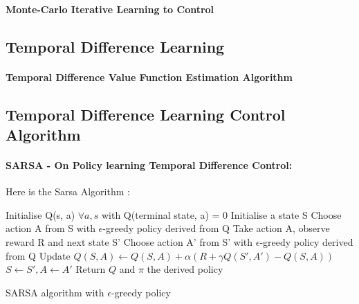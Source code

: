 		\paragraph*{Monte-Carlo Iterative Learning to Control}

	\subsection{Temporal Difference Learning} %
		\label{sub:temporal_difference_learning}
		
		\paragraph*{Temporal Difference Value Function Estimation Algorithm}

	\subsection{Temporal Difference Learning Control Algorithm} %
		\label{sub:temporal_difference_learning_control_algorithm}
		
		\paragraph*{SARSA - On Policy learning Temporal Difference Control:}
			Here is the Sarsa Algorithm : \\
			\begin{algorithm}[H]
				Initialise Q(s, a) $\forall a, s$ with Q(terminal state, a) = 0  \;
				{
					Initialise a state S\;
					Choose action A from S with $\epsilon$-greedy policy derived from Q\;
					{
						Take action A, observe reward R and next state S'\;
						Choose action A' from S' with $\epsilon$-greedy policy derived from Q\;
						Update $Q(S, A) \leftarrow Q(S, A) + \alpha (R + \gamma Q(S', A')- Q(S, A))$\;
						$S \leftarrow S', A \leftarrow A'$
					}
				}
				Return $Q$ and $\pi$ the derived policy
				\caption{SARSA algorithm with $\epsilon$-greedy policy}
			\end{algorithm}


